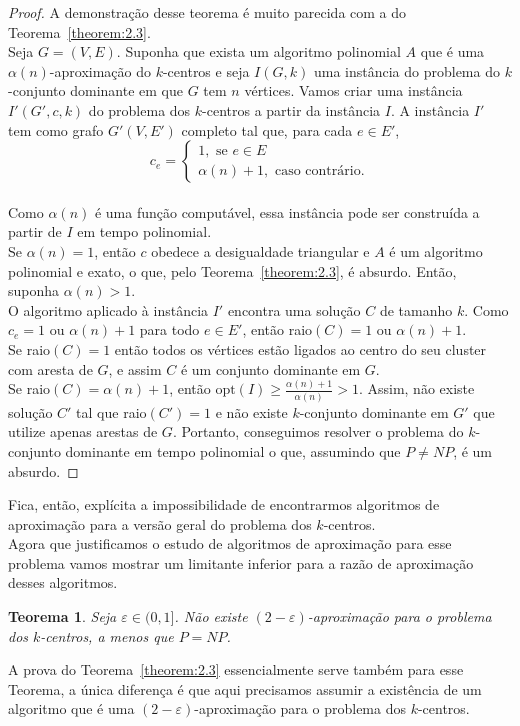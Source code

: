 \documentclass[12pt]{article}
\newcommand{\opt}{\ensuremath{\mathrm{opt}}}
\newtheorem{theorem}{Teorema}[section]
\newcommand{\NP}{\mathit{NP}}
\begin{document}
\begin{proof}
        A demonstração desse teorema é muito parecida com a do Teorema~\ref{theorem:2.3}. \\
        Seja $G = (V,E)$. Suponha que exista um algoritmo polinomial $A$ que é uma $\alpha(n)$-aproximação do $k$-centros e seja $I(G,k)$ uma instância do problema do $k$-conjunto dominante em que $G$ tem $n$ vértices. Vamos criar uma instância $I'(G',c,k)$ do problema dos $k$-centros a partir da instância $I$. A instância $I'$ tem como grafo $G'(V,E')$ completo tal que, para cada $e \in E'$, \\
    \[c_e = \begin{cases}
            1, \text{ se } e \in E \\
            \alpha(n)+1, \text{ caso contrário.} 
            \end{cases}\]\\
    Como $\alpha(n)$ é uma função computável, essa instância pode ser construída a partir de $I$ em tempo polinomial. \\
    Se $\alpha(n)=1$, então $c$ obedece a desigualdade triangular e $A$ é um algoritmo polinomial e exato, o que, pelo Teorema~\ref{theorem:2.3}, é absurdo. Então, suponha $\alpha(n)>1$. \\
    O algoritmo aplicado à instância $I'$ encontra uma solução $C$ de tamanho $k$. Como $c_e = 1$ ou $\alpha(n)+1$ para todo $e \in E'$, então raio$(C)=1$ ou $\alpha(n)+1$.\\
    Se raio$(C)=1$ então todos os vértices estão ligados ao centro do seu cluster com aresta de $G$, e assim $C$ é um conjunto dominante em $G$. \\
    Se raio$(C) = \alpha(n) + 1$, então $\opt(I) \geq \frac{\alpha(n)+1}{\alpha(n)}>1$. Assim, não existe solução $C'$ tal que raio$(C')=1$ e não existe $k$-conjunto dominante em $G'$ que utilize apenas arestas de $G$.
    Portanto, conseguimos resolver o problema do $k$-conjunto dominante em tempo polinomial o que, assumindo que $P \neq \NP$, é um absurdo.
\end{proof}
    Fica, então, explícita a impossibilidade de encontrarmos algoritmos de aproximação para a versão geral do problema dos $k$-centros.\\
    Agora que justificamos o estudo de algoritmos de aproximação para esse problema vamos mostrar um limitante inferior para a razão de aproximação desses algoritmos.
    
    \begin{theorem}
        Seja $\varepsilon \in (0,1]$. Não existe $(2-\varepsilon)$-aproximação para o problema dos $k$-centros, a menos que $P=\NP$.
    \end{theorem}
    A prova do Teorema~\ref{theorem:2.3} essencialmente serve também para esse Teorema, a única diferença é que aqui precisamos assumir a existência de um algoritmo que é uma $(2 - \varepsilon)$-aproximação para o problema dos $k$-centros.
\end{document}
